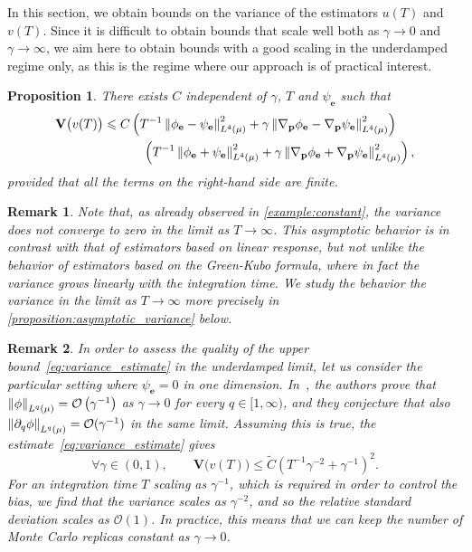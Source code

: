 \documentclass[11pt,a4paper]{article}
\newcommand{\var}[0]{\mathbf{V}}
\newcommand{\grad}{\nabla}
\newcommand{\vect}[1]{\boldsymbol{\mathbf #1}}
\theoremstyle{plain}
\newtheorem{proposition}{Proposition}[section]
\newtheorem{remark}{Remark}[section]
\numberwithin{equation}{section}
\renewcommand{\leq}{\leqslant}
\begin{document}
In this section, we obtain bounds on the variance of the estimators $u(T)$ and $v(T)$.
Since it is difficult to obtain bounds that scale well both as $\gamma \to 0$ and $\gamma \to \infty$,
we aim here to obtain bounds with a good scaling in the underdamped regime only,
as this is the regime where our approach is of practical interest.

\begin{proposition}
    There exists $C$ independent of $\gamma$, $T$ and $\psi_{\vect e}$ such that
    \begin{align}
        \var \bigl(v(T)\bigr)
        \leq
        C &\left( T^{-1} \norm{\phi_{\vect e} - \psi_{\vect e}}[L^4(\mu)]^2  + \gamma \norm{\grad_{\vect p} \phi_{\vect e} - \grad_{\vect p} \psi_{\vect e}}[L^4(\mu)]^2 \right) \\
        \label{eq:variance_estimate}
          &\quad \left( T^{-1} \norm{\phi_{\vect e} + \psi_{\vect e}}[L^4(\mu)]^2  + \gamma \norm{\grad_{\vect p} \phi_{\vect e} + \grad_{\vect p} \psi_{\vect e}}[L^4(\mu)]^2 \right),
    \end{align}
    provided that all the terms on the right-hand side are finite.
\end{proposition}
\begin{remark}
    Note that,
    as already observed in \cref{example:constant},
    the variance does not converge to zero in the limit as $T \to \infty$.
    This asymptotic behavior is in contrast with that of estimators based on linear response,
    but not unlike the behavior of estimators based on the Green-Kubo formula,
    where in fact the variance grows linearly with the integration time.
    We study the behavior the variance in the limit as $T \to \infty$ more precisely in \cref{proposition:asymptotic_variance} below.
\end{remark}
\begin{remark}
    In order to assess the quality of the upper bound~\eqref{eq:variance_estimate} in the underdamped limit,
    let us consider the particular setting where $\psi_{\vect e} = 0$ in one dimension.
    In~\cite[Remark 6.10]{MR2394704},
    the authors prove that $\norm{\phi}[\lp{q}{\mu}] = \bigo{\gamma^{-1}}$ as $\gamma \to 0$ for every $q \in [1, \infty)$,
    and they conjecture that also $\norm{\partial_q \phi}[\lp{q}{\mu}] = \mathcal O(\gamma^{-1})$ in the same limit.
    Assuming this is true, the estimate~\eqref{eq:variance_estimate} gives
    \begin{equation}
        \label{eq:variance_scaling}
        \forall \gamma \in (0, 1), \qquad
        \var \bigl(v(T)\bigr)
        \leq \widetilde C \left( T^{-1} \gamma^{-2} + \gamma^{-1} \right)^2.
    \end{equation}
    For an integration time $T$ scaling as $\gamma^{-1}$,
    which is required in order to control the bias,
    we find that the variance scales as $\gamma^{-2}$,
    and so the relative standard deviation scales as $\mathcal O(1)$.
    In practice, this means that we can keep the number of Monte Carlo replicas constant as $\gamma \to 0$.
\end{remark}
\end{document}
